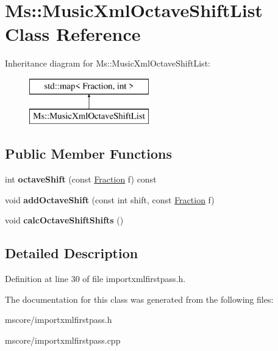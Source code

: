 \hypertarget{class_ms_1_1_music_xml_octave_shift_list}{}\section{Ms\+:\+:Music\+Xml\+Octave\+Shift\+List Class Reference}
\label{class_ms_1_1_music_xml_octave_shift_list}
Inheritance diagram for Ms\+:\+:Music\+Xml\+Octave\+Shift\+List\+:\begin{figure}[H]
\begin{center}
\leavevmode
\includegraphics[height=2.000000cm]{class_ms_1_1_music_xml_octave_shift_list}
\end{center}
\end{figure}
\subsection*{Public Member Functions}
\begin{DoxyCompactItemize}
\item 
\mbox{\label{class_ms_1_1_music_xml_octave_shift_list_a8d2486a5bdd1a3b1725027c10c4a8cf4}} 
int {\bfseries octave\+Shift} (const \hyperlink{class_ms_1_1_fraction}{Fraction} f) const
\item 
\mbox{\label{class_ms_1_1_music_xml_octave_shift_list_ac9d00d8c422e7190dec0c748a8b7968a}} 
void {\bfseries add\+Octave\+Shift} (const int shift, const \hyperlink{class_ms_1_1_fraction}{Fraction} f)
\item 
\mbox{\label{class_ms_1_1_music_xml_octave_shift_list_a2fedd4f7472907977f24ac6922d8b955}} 
void {\bfseries calc\+Octave\+Shift\+Shifts} ()
\end{DoxyCompactItemize}


\subsection{Detailed Description}


Definition at line 30 of file importxmlfirstpass.\+h.



The documentation for this class was generated from the following files\+:\begin{DoxyCompactItemize}
\item 
mscore/importxmlfirstpass.\+h\item 
mscore/importxmlfirstpass.\+cpp\end{DoxyCompactItemize}
